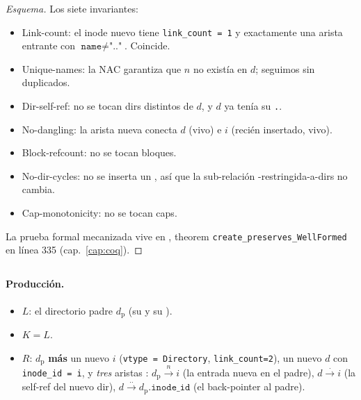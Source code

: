 \begin{proof}[Esquema]
Los siete invariantes:
\begin{itemize}
  \item Link-count: el inode nuevo tiene \texttt{link\_count = 1} y
    exactamente una arista \econtains{} entrante con $\texttt{name} \neq
    \texttt{".."}$. Coincide.
  \item Unique-names: la NAC garantiza que $n$ no existía en $d$;
    seguimos sin duplicados.
  \item Dir-self-ref: no se tocan dirs distintos de $d$, y $d$ ya
    tenía su \texttt{.}.
  \item No-dangling: la arista nueva conecta $d$ (vivo) e $i$ (recién
    insertado, vivo).
  \item Block-refcount: no se tocan bloques.
  \item No-dir-cycles: no se inserta un \NDir, así que la sub-relación
    \econtains-restringida-a-dirs no cambia.
  \item Cap-monotonicity: no se tocan caps.
\end{itemize}
La prueba formal mecanizada vive en , theorem
\texttt{create\_preserves\_WellFormed} en línea 335 (cap.~\ref{cap:coq}).
\end{proof}

\subsection{\opmkdir}

\paragraph{Producción.}

\begin{itemize}
  \item $L$: el directorio padre $d_{\text{p}}$ (su \NDir{} y su \NInode).
  \item $K = L$.
  \item $R$: $d_{\text{p}}$ \textbf{más} un nuevo \NInode{} $i$
    (\texttt{vtype = Directory}, \texttt{link\_count=2}), un nuevo
    \NDir{} $d$ con \texttt{inode\_id = i}, y \emph{tres} aristas
    \econtains: $d_{\text{p}} \xrightarrow{n} i$ (la entrada nueva en
    el padre), $d \xrightarrow{\,.\,} i$ (la self-ref del nuevo dir),
    $d \xrightarrow{\,..\,} d_{\text{p}}.\texttt{inode\_id}$ (el back-pointer al padre).
\end{itemize}

